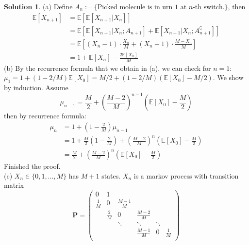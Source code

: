 \documentclass[a4paper, 10pt]{article}
\theoremstyle{definition}
\theoremstyle{hSol}
\newtheorem*{solution}{Solution}
\begin{document}
\begin{solution} (a) Define $A_n:=\{\text{Picked molecule is in urn 1 at $n$-th switch.}\}$, then
\begin{equation}
  \begin{split}
    \mathbb{E}\left[X_{n+1}\right] &= \mathbb{E}\left[\mathbb{E}\left[X_{n+1}|X_n\right]\right]\\
    &= \mathbb{E}\left[\mathbb{E}\left[X_{n+1}|X_n;A_{n+1}\right] + \mathbb{E}[X_{n+1}|X_n;A^{\complement}_{n+1}]\right]  \\
    &= \mathbb{E}\left[(X_n-1)\cdot\frac{X_n}{M} + (X_n+1)\cdot\frac{M-X_n}{M}\right]\\
    &= 1 + \mathbb{E}\left[X_n\right] - \frac{2 \mathbb{E}\left[X_n\right]}{M}
  \end{split}
\end{equation}
(b) By the recurrence formula that we obtain in (a), we can check for $n=1$: $\mu_1=1+(1-2/M)\mathbb{E}\left[X_0\right]=M/2 + (1-2/M)(\mathbb{E}\left[X_0\right]-M/2)$. We show by induction. Assume
\begin{equation}
  \mu_{n-1} = \frac{M}{2} + \left(\frac{M-2}{M}\right)^{n-1} \left(\mathbb{E}\left[X_0\right]-\frac{M}{2}\right)
\end{equation}
then by recurrence formula:
\begin{equation}
  \begin{split}
    \mu_n &= 1+\left(1-\frac{2}{M}\right)\mu_{n-1} \\
    &= 1+\frac{M}{2}\left(1-\frac{2}{M}\right)+\left(\frac{M-2}{M}\right)^n\left(\mathbb{E}\left[X_0\right]-\frac{M}{2}\right) \\
    &= \frac{M}{2} + \left(\frac{M-2}{M}\right)^{n} \left(\mathbb{E}\left[X_0\right]-\frac{M}{2}\right)
  \end{split}
\end{equation}
Finished the proof.\\
(c) $X_n\in \{0, 1, ..., M\}$ has $M+1$ states. $X_n$ is a markov process with transition matrix
\begin{equation}
  \bm{P} = \begin{pmatrix}
    0 & 1 &  &  &  &\\[5pt]
    \frac{1}{M} & 0 & \frac{M-1}{M} &  &  &\\[5pt]
    & \frac{2}{M} & 0 & \frac{M-2}{M} &  &\\[5pt]
    & & \ddots & \ddots &  \ddots &\\[5pt]
    & & & \frac{M-1}{M} & 0 & \frac{1}{M} \\[5pt]

\end{pmatrix}
\end{equation}
\end{solution}
\end{document}
